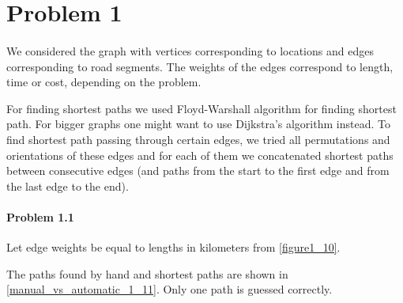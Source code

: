 \section{Problem 1}

\paragraph{}
We considered the graph with vertices corresponding to locations and edges corresponding to road segments. The weights of the edges correspond to length, time or cost, depending on the problem.

For finding shortest paths we used Floyd-Warshall algorithm for finding shortest path. For bigger graphs one might want to use Dijkstra’s algorithm instead. To find shortest path passing through certain edges, we tried all permutations and orientations of these edges and for each of them we concatenated shortest paths between consecutive edges (and paths from the start to the first edge and from the last edge to the end).

\paragraph{Problem 1.1}
Let edge weights be equal to lengths in kilometers from \ref{figure1_10}.

The paths found by hand and shortest paths are shown in \ref{manual_vs_automatic_1_11}. Only one path is guessed correctly.

